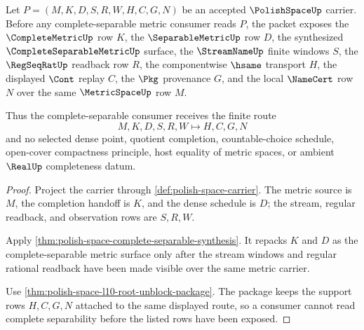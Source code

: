 \begin{theorem}
\label{thm:polish-space-complete-separable-metric-row}
Let $P=(M,K,D,S,R,W,H,C,G,N)$ be an accepted $\PolishSpaceUp$ carrier. Before any complete-separable metric consumer reads $P$, the packet exposes the $\CompleteMetricUp$ row $K$, the $\SeparableMetricUp$ row $D$, the synthesized $\CompleteSeparableMetricUp$ surface, the $\StreamNameUp$ finite windows $S$, the $\RegSeqRatUp$ readback row $R$, the componentwise $\hsame$ transport $H$, the displayed $\Cont$ replay $C$, the $\Pkg$ provenance $G$, and the local $\NameCert$ row $N$ over the same $\MetricSpaceUp$ row $M$.

Thus the complete-separable consumer receives the finite route
$$
M,K,D,S,R,W \longmapsto H,C,G,N
$$
and no selected dense point, quotient completion, countable-choice schedule, open-cover compactness principle, host equality of metric spaces, or ambient $\RealUp$ completeness datum.
\end{theorem}
\begin{proof}
Project the carrier through \autoref{def:polish-space-carrier}. The metric source is $M$, the completion handoff is $K$, and the dense schedule is $D$; the stream, regular readback, and observation rows are $S,R,W$.

Apply \autoref{thm:polish-space-complete-separable-synthesis}. It repacks $K$ and $D$ as the complete-separable metric surface only after the stream windows and regular rational readback have been made visible over the same metric carrier.

Use \autoref{thm:polish-space-l10-root-unblock-package}. The package keeps the support rows $H,C,G,N$ attached to the same displayed route, so a consumer cannot read complete separability before the listed rows have been exposed.
\end{proof}

